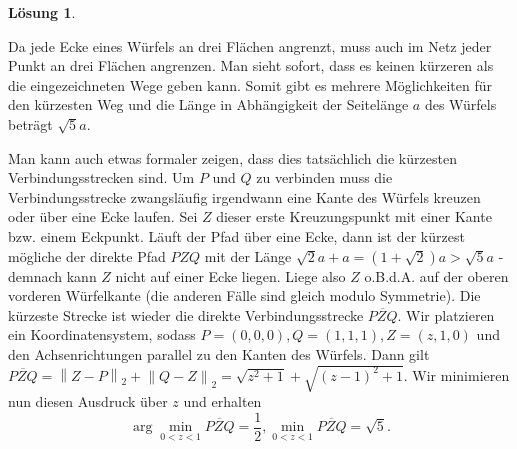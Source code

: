 \documentclass{article}
\theoremstyle{plain} %
\theoremstyle{definition} %
\newtheorem{solution}[theorem]{Lösung}
\newcommand{\abs}[1]{\left\lVert#1\right\rVert} %
\begin{document}
\begin{solution}
\begin{center}
  \end{center}
  Da jede Ecke eines Würfels an drei Flächen angrenzt, muss auch im Netz jeder Punkt an drei Flächen angrenzen. Man sieht sofort, dass es keinen kürzeren als die eingezeichneten Wege geben kann. Somit gibt es mehrere Möglichkeiten für den kürzesten Weg und die Länge in Abhängigkeit der Seitelänge $a$ des Würfels beträgt $\sqrt5 a$.

  \begin{center}
  \end{center}

  Man kann auch etwas formaler zeigen, dass dies tatsächlich die kürzesten Verbindungsstrecken sind. Um $P$ und $Q$ zu verbinden muss die Verbindungsstrecke zwangsläufig irgendwann eine Kante des Würfels kreuzen oder über eine Ecke laufen. Sei $Z$ dieser erste Kreuzungspunkt mit einer Kante bzw. einem Eckpunkt. Läuft der Pfad über eine Ecke, dann ist der kürzest mögliche der direkte Pfad $PZQ$ mit der Länge $\sqrt{2}a + a = (1+\sqrt{2}) a > \sqrt{5} a$ - demnach kann $Z$ nicht auf einer Ecke liegen. Liege also $Z$ o.B.d.A. auf der oberen vorderen Würfelkante (die anderen Fälle sind gleich modulo Symmetrie). Die kürzeste Strecke ist wieder die direkte Verbindungsstrecke $\overline{PZQ}$. Wir platzieren ein Koordinatensystem, sodass $P=(0,0,0), Q = (1,1,1), Z = (z, 1, 0)$ und den Achsenrichtungen parallel zu den Kanten des Würfels. Dann gilt $\overline{PZQ} = \abs{Z - P}_2 + \abs{Q - Z}_2 = \sqrt{z^2 + 1} + \sqrt{(z-1)^2 + 1}$. Wir minimieren nun diesen Ausdruck über $z$ und erhalten $$\arg \min_{0<z<1} \overline{PZQ} = \frac{1}{2}, \min_{0<z<1} \overline{PZQ} = \sqrt{5}.$$
\end{solution}
\end{document}
